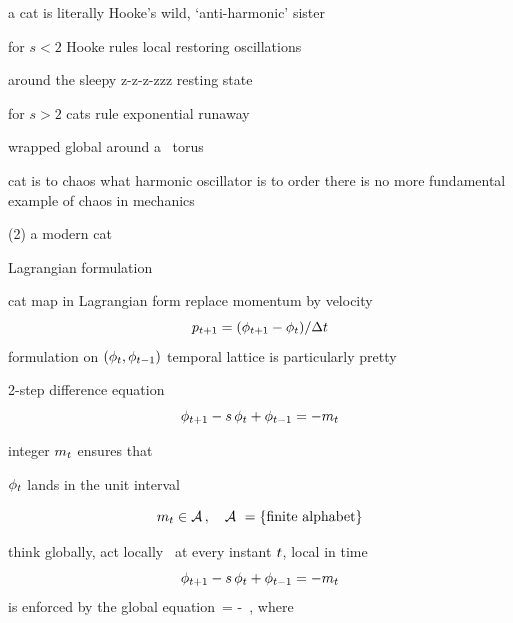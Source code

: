 \begin{frame}{a cat is literally Hooke's wild, `anti-harmonic' sister}

\begin{block}{for $s<2$ Hooke rules}
local restoring oscillations

around the sleepy z-z-z-zzz resting state
\end{block}

\begin{block}{for $s>2$ cats rule}
exponential runaway

wrapped global around a \statesp\ torus
\end{block}
\bigskip

\hfill
{\color{red}cat} is to {\color{red}chaos}
what {\color{red}harmonic oscillator} is to {\color{red}order}
\vfill
\hfill
{\color{blue}there is no more fundamental example of chaos in mechanics}
\end{frame}


\begin{frame}{(2) a modern cat}
\vfill
\begin{center}
{\huge Lagrangian formulation}
\end{center}
\vfill
\end{frame}

\begin{frame}{cat map in Lagrangian form}
replace momentum by velocity
\[
p_{t+1}=(\phi_{t+1}  - \phi_{t})/\Delta t
\]
formulation on $(\phi_{t},\phi_{t-1})$ temporal lattice
is particularly pretty
\begin{block}{2-step difference equation}
\[
\phi_{t+1}  -  s \, \phi_{t} + \phi_{t-1}
    =
-{m_{t}}
\] %
\end{block}
integer ${m_{t}}$ ensures that

\hfill $\phi_{t}$ lands in the unit interval

\bigskip
\[
{m_{t}}\in  \mathcal{A}
\,,\quad \mathcal{A}\ = \{\mbox{finite alphabet}\}
\]
\end{frame}

\begin{frame}{think globally, act locally}
\templatt\ at every instant $t$, {\color{blue}local} in time
\[
\phi_{t+1}  -  s \, \phi_{t} + \phi_{t-1}
    =
-{m_{t}}
\] %
is enforced by the {\color{blue}global} equation
\beq
 \jMorb\,\Xx = -\Mm
\,,
where
\end{frame}

